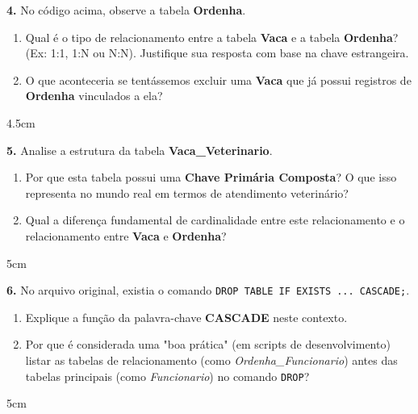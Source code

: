 \documentclass[12pt]{article}
\begin{document}
\textbf{4.} No código acima, observe a tabela \textbf{Ordenha}.
\begin{enumerate}[label=\alph*)]
  \item Qual é o tipo de relacionamento entre a tabela \textbf{Vaca} e a tabela \textbf{Ordenha}? (Ex: 1:1, 1:N ou N:N). Justifique sua resposta com base na chave estrangeira.
  \item O que aconteceria se tentássemos excluir uma \textbf{Vaca} que já possui registros de \textbf{Ordenha} vinculados a ela?
\end{enumerate}
\begin{resposta}{4.5cm}
\end{resposta}



\textbf{5.} Analise a estrutura da tabela \textbf{Vaca\_Veterinario}.
\begin{enumerate}[label=\alph*)]
  \item Por que esta tabela possui uma \textbf{Chave Primária Composta}? O que isso representa no mundo real em termos de atendimento veterinário?
  \item Qual a diferença fundamental de cardinalidade entre este relacionamento e o relacionamento entre \textbf{Vaca} e \textbf{Ordenha}?
\end{enumerate}
\begin{resposta}{5cm}
\end{resposta}

\vspace{0.5cm}

\textbf{6.} No arquivo original, existia o comando \texttt{DROP TABLE IF EXISTS ... CASCADE;}.
\begin{enumerate}[label=\alph*)]
  \item Explique a função da palavra-chave \textbf{CASCADE} neste contexto.
  \item Por que é considerada uma "boa prática" (em scripts de desenvolvimento) listar as tabelas de relacionamento (como \textit{Ordenha\_Funcionario}) antes das tabelas principais (como \textit{Funcionario}) no comando \texttt{DROP}?
\end{enumerate}
\begin{resposta}{5cm}
\end{resposta}
\end{document}
